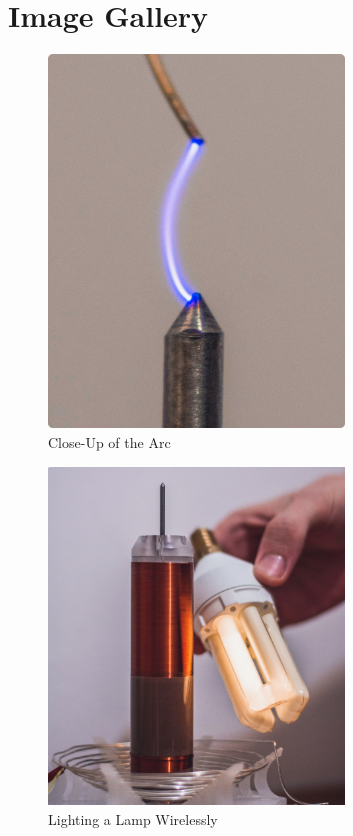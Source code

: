 \newpage
\section{Image Gallery}

\begin{figure}[h!]
    \centering
    \includegraphics[width=0.7\textwidth]{simon/resources/blitzi1.jpg}
    \caption{Close-Up of the Arc}
    \label{fig:arc-closeup}
\end{figure}

\begin{figure}[h!]
    \centering
    \includegraphics[width=0.7\textwidth]{simon/resources/blitzi2.jpg}
    \caption{Lighting a Lamp Wirelessly}
    \label{fig:lamp}
\end{figure}